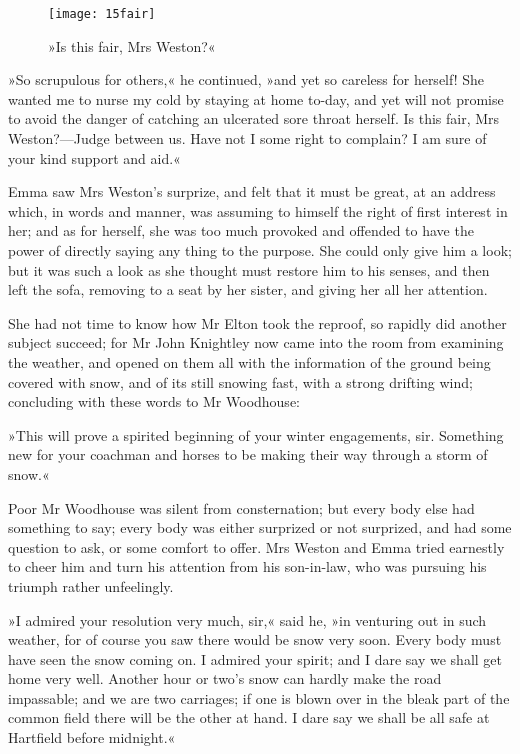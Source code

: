 \begin{figure}[tbph]
\centering
\texttt{[image: 15fair]}
\caption{»Is this fair, Mrs Weston?«}
\end{figure}

»So scrupulous for others,« he continued, »and yet so careless for herself! She wanted me to nurse my cold by staying at home to-day, and yet will not promise to avoid the danger of catching an ulcerated sore throat herself. Is this fair, Mrs Weston?—Judge between us. Have not I some right to complain? I am sure of your kind support and aid.«

Emma saw Mrs Weston's surprize, and felt that it must be great, at an address which, in words and manner, was assuming to himself the right of first interest in her; and as for herself, she was too much provoked and offended to have the power of directly saying any thing to the purpose. She could only give him a look; but it was such a look as she thought must restore him to his senses, and then left the sofa, removing to a seat by her sister, and giving her all her attention.

She had not time to know how Mr Elton took the reproof, so rapidly did another subject succeed; for Mr John Knightley now came into the room from examining the weather, and opened on them all with the information of the ground being covered with snow, and of its still snowing fast, with a strong drifting wind; concluding with these words to Mr Woodhouse:

»This will prove a spirited beginning of your winter engagements, sir. Something new for your coachman and horses to be making their way through a storm of snow.«

Poor Mr Woodhouse was silent from consternation; but every body else had something to say; every body was either surprized or not surprized, and had some question to ask, or some comfort to offer. Mrs Weston and Emma tried earnestly to cheer him and turn his attention from his son-in-law, who was pursuing his triumph rather unfeelingly.

»I admired your resolution very much, sir,« said he, »in venturing out in such weather, for of course you saw there would be snow very soon. Every body must have seen the snow coming on. I admired your spirit; and I dare say we shall get home very well. Another hour or two's snow can hardly make the road impassable; and we are two carriages; if one is blown over in the bleak part of the common field there will be the other at hand. I dare say we shall be all safe at Hartfield before midnight.«

